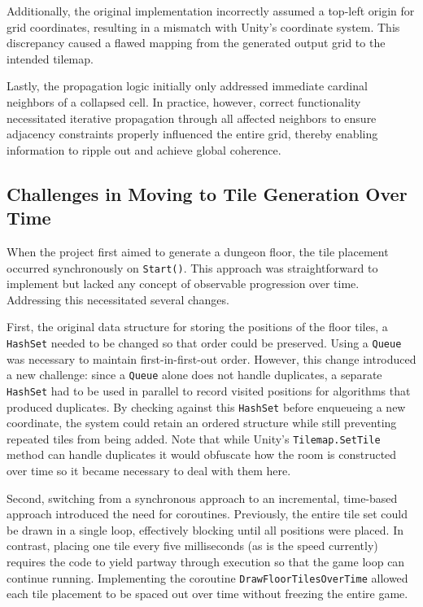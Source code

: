 \documentclass[a4paper, 12pt, one column, aas_macros]{article}
\begin{document}
Additionally, the original implementation incorrectly assumed a top-left origin for grid coordinates, resulting in a mismatch with Unity's coordinate system. This discrepancy caused a flawed mapping from the generated output grid to the intended tilemap.

Lastly, the propagation logic initially only addressed immediate cardinal neighbors of a collapsed cell. In practice, however, correct functionality necessitated iterative propagation through all affected neighbors to ensure adjacency constraints properly influenced the entire grid, thereby enabling information to ripple out and achieve global coherence.

\subsection{Challenges in Moving to Tile Generation Over Time}
When the project first aimed to generate a dungeon floor, the tile placement occurred synchronously on \texttt{Start()}. This approach was straightforward to implement but lacked any concept of observable progression over time. Addressing this necessitated several changes. 

First, the original data structure for storing the positions of the floor tiles, a \texttt{HashSet} needed to be changed so that order could be preserved. Using a \texttt{Queue} was necessary to maintain first-in-first-out order. However, this change introduced a new challenge: since a \texttt{Queue} alone does not handle duplicates, a separate \texttt{HashSet} had to be used in parallel to record visited positions for algorithms that produced duplicates. By checking against this \texttt{HashSet} before enqueueing a new coordinate, the system could retain an ordered structure while still preventing repeated tiles from being added. Note that while Unity's \texttt{Tilemap.SetTile} method can handle duplicates it would obfuscate how the room is constructed over time so it became necessary to deal with them here.

Second, switching from a synchronous approach to an incremental, time-based approach introduced the need for coroutines. Previously, the entire tile set could be drawn in a single loop, effectively blocking until all positions were placed. In contrast, placing one tile every five milliseconds (as is the speed currently) requires the code to yield partway through execution so that the game loop can continue running. Implementing the coroutine \texttt{DrawFloorTilesOverTime} allowed each tile placement to be spaced out over time without freezing the entire game.
\end{document}
